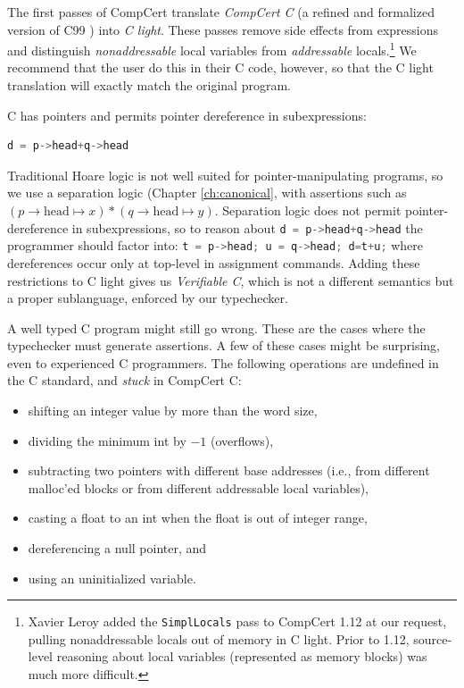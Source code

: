 \documentclass{puthesis}
\begin{document}
The first passes of CompCert translate
\emph{CompCert C} (a refined and formalized version of C99
\cite{Compcert-compiler-website}) into \emph{C light}.
These passes remove side effects from expressions
and distinguish \emph{nonaddressable} local variables from
\emph{addressable} locals.\footnote{Xavier Leroy
added the \lstinline|SimplLocals| pass to CompCert 1.12 at our request,
pulling nonaddressable locals out of memory in C light.
Prior to 1.12, source-level reasoning about local
variables (represented as memory blocks) was  much more difficult.} We recommend
that the user do this in their C code, however, so that the C light translation
will exactly match the original program.

C has pointers and permits pointer dereference in subexpressions: 
\begin{lstlisting}[language=C]
d = p->head+q->head
\end{lstlisting}

Traditional Hoare logic is not well suited for pointer-manipulating programs,
so we use a separation logic (Chapter \ref{ch:canonical}, with assertions such as 
$(p\!\!\rightarrow \! \! \mathrm{head} \mapsto x) *(q \!\! \rightarrow \! \!
\mathrm{head} \mapsto y)$. Separation logic does not permit pointer-dereference
in subexpressions, so to reason about 
\lstinline[language=C]|d = p->head+q->head| 
the programmer should factor into:
\lstinline[language=c]|t = p->head; u = q->head; d=t+u;|
where dereferences occur only at top-level in assignment commands.
Adding these restrictions to C light gives us \emph{Verifiable C}, which is not
a different semantics but a proper sublanguage, enforced by our typechecker.

A well typed C program might still go wrong. These are the cases where the
typechecker must generate assertions. A few of these cases might be surprising,
even to experienced C programmers.
The following operations are undefined in the C standard,
and \emph{stuck} in CompCert C:
\begin {itemize}
  \item shifting an integer value by more than the word size,
  \item dividing the minimum int by $-1$  (overflows),
  \item subtracting two pointers with different base addresses (i.e.,
from different malloc'ed blocks or from different addressable local
variables),
  \item casting a float to an int when the float is out of integer range,
  \item dereferencing a null pointer, and
  \item using an uninitialized variable.
\end{itemize}
\end{document}

